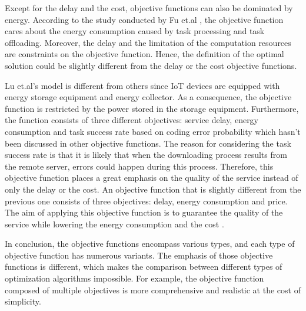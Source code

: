\documentclass[a4paper,11pt]{article}
\begin{document}
Except for the delay and the cost, objective functions can also be dominated by energy. According to the study conducted by Fu et.al \cite{objective_energy_2}, the objective function cares about the energy consumption caused by task processing and task offloading. Moreover, the delay and the limitation of the computation resources are constraints on the objective function. Hence, the definition of the optimal solution could be slightly different from the delay or the cost objective functions. \newline

Lu et.al's model  
\cite{energy_objective} is different from others since IoT devices are equipped with energy storage equipment and energy collector. As a consequence, the objective function is restricted by the power stored in the storage equipment. Furthermore, the function consists of three different objectives: service delay, energy consumption and task success rate based on coding error probability which hasn't been discussed in other objective functions. The reason for considering the task success rate is that it is likely that when the downloading process results from the remote server, errors could happen during this process. Therefore, this objective function places a great emphasis on the quality of the service instead of only the delay or the cost. An objective function that is slightly different from the previous one consists of three objectives: delay, energy consumption and price. The aim of applying this objective function is to guarantee the quality of the service while lowering the energy consumption and the cost \cite{user_central}. \newline

In conclusion, the objective functions encompass various types, and each type of objective function has numerous variants. The emphasis of those objective functions is different, which makes the comparison between different types of optimization algorithms impossible. For example, the objective function composed of multiple objectives is more comprehensive and realistic at the cost of simplicity. 





\end{document}
